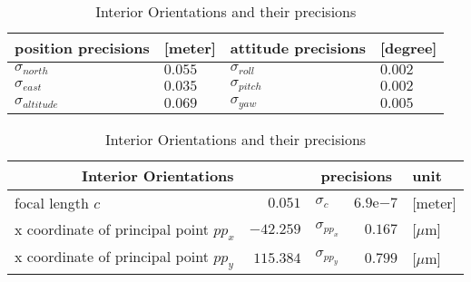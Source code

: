 \begin{table}[!h]
	\centering
	\begin{tabular}{ll|ll}
		\toprule
		position precisions  &[meter]  & attitude precisions & [degree]\\
		\midrule
		$\sigma_{north}$     & $0.055$ & $\sigma_{roll}$  & $0.002$\\
		$\sigma_{east}$      & $0.035$ & $\sigma_{pitch}$ & $0.002$\\
		$\sigma_{altitude}$  & $0.069$ & $\sigma_{yaw}$   & $0.005$\\
		\bottomrule
	\end{tabular}
	\caption{Precisions of Exterior Orientations}
	\label{tab:EOprecision}
	\vspace{0.5cm}
	\centering
	\begin{tabular}{lr|lr|l}
		\toprule
		\multicolumn{2}{c|}{Interior Orientations}  & \multicolumn{2}{c|}{precisions} & unit\\
		\midrule
		focal length $c$                       &   $0.051$ & $\sigma_c$      & $6.9\mathrm{e}{-7}$ & [meter]\\
		x coordinate of principal point $pp_x$ & $-42.259$ & $\sigma_{pp_x}$ & $0.167$             &[$\mu$m]\\
		x coordinate of principal point $pp_y$ & $115.384$ & $\sigma_{pp_y}$ & $0.799$             &[$\mu$m]\\
		\bottomrule
	\end{tabular}
	\caption{Interior Orientations and their precisions}
	\label{tab:IOprecision}
\end{table}


